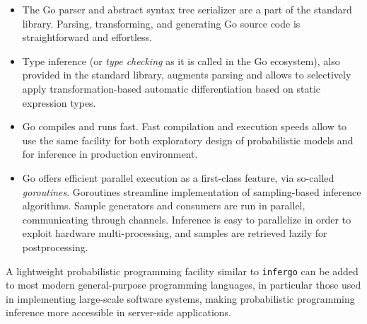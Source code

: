 \documentclass[sigplan,review]{acmart}\settopmatter{printfolios=true,printccs=false,printacmref=false}
\begin{document}
\begin{itemize}
    \item The Go parser and abstract syntax tree serializer are
        a part of the standard library. Parsing, transforming,
        and generating Go source code is straightforward and
        effortless.
	\item Type inference (or \textit{type checking} as it is
		called in the Go ecosystem), also provided in the
		standard library, augments parsing and allows to
		selectively apply transformation-based automatic
		differentiation  based on static expression types. 
	\item Go compiles and runs fast. Fast compilation and
		execution speeds allow to use the same facility for both
		exploratory design of probabilistic models and for
		inference in production environment.
	\item Go offers efficient parallel execution as a
		first-class feature, via so-called \textit{goroutines}.
		Goroutines streamline implementation of sampling-based
		inference algorithms. Sample generators and consumers
		are run in parallel, communicating through channels. 
		Inference is easy to parallelize in order to exploit
		hardware multi-processing, and samples are retrieved
		lazily for postprocessing. 
\end{itemize}

A lightweight probabilistic programming facility similar to
\texttt{infergo} can be added to most modern general-purpose
programming languages, in particular those used in implementing
large-scale software systems, making probabilistic
programming inference more accessible in server-side
applications.


\end{document}
